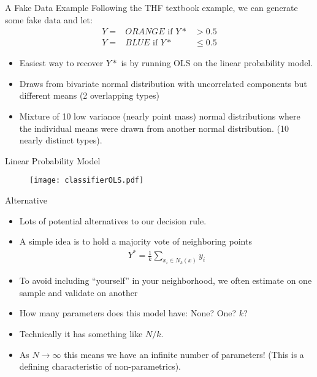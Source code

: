 \documentclass[11pt,handout,xcolor=pdftex,dvipsnames,table,mathserif]{beamer}
\begin{document}
\begin{frame}{A Fake Data Example}
Following the THF textbook example, we can generate some fake data and let: 
\begin{eqnarray*}
Y=&ORANGE \mbox{ if } Y* &> 0.5 \\
Y=&BLUE  \mbox{ if }   Y* &\leq 0.5
\end{eqnarray*}
\begin{itemize}
\item Easiest way to recover $Y*$ is by running OLS on the linear probability model.
\item Draws from bivariate normal distribution with uncorrelated components but different means (2 overlapping types)
\item Mixture of 10 low variance (nearly point mass) normal distributions where the individual means were drawn from another normal distribution. (10 nearly distinct types).
\end{itemize}
\end{frame}

\begin{frame}{Linear Probability Model}
\begin{figure}[htbp]
\begin{center}
\texttt{[image: classifierOLS.pdf]}
\label{classOLS}
\end{center}
\end{figure}
\end{frame}


\begin{frame}{Alternative}
\begin{itemize}
\item Lots of potential alternatives to our decision rule.
\item A simple idea is to hold a majority vote of neighboring points 
\begin{eqnarray*}
Y^{*} = \frac{1}{k} \sum_{x_i \in N_k(x)} y_i
\end{eqnarray*}
\item To avoid including ``yourself'' in your neighborhood, we often estimate on one sample and validate on another
\item How many parameters does this model have: None? One? $k$? 
\item Technically it has something like $N/k$.
\item As $N \rightarrow \infty$ this means we have an infinite number of parameters! (This is a defining characteristic of non-parametrics).
\end{itemize}
\end{frame}
\end{document}

